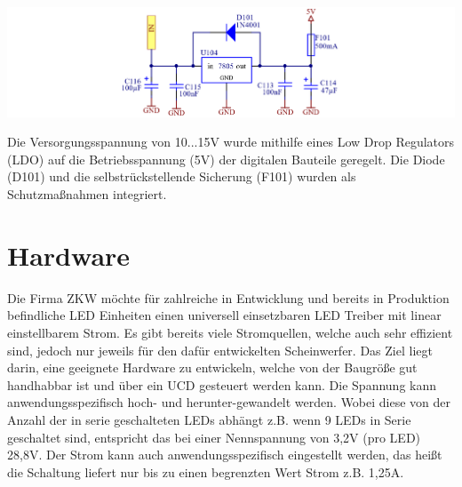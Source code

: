 \documentclass[paper=a4, 12pt]{scrreprt}
\begin{document}
	\begin{adjustbox}{center,caption={VoltageRegulator 7805 },label={fig:VoltageRegulator.PNG},nofloat=figure,vspace=\bigskipamount}
		\includegraphics[width=\textwidth]{img/VoltageRegulator.PNG}
	\end{adjustbox}
 	Die Versorgungsspannung von 10...15V wurde mithilfe eines Low Drop Regulators (LDO) auf die Betriebsspannung (5V) der digitalen Bauteile geregelt. Die Diode (D101) und die selbstrückstellende Sicherung (F101) wurden als Schutzmaßnahmen integriert.
	\newpage
	
	\section{Hardware}\hfill \break
	Die Firma ZKW möchte für zahlreiche in Entwicklung und bereits in Produktion befindliche LED Einheiten einen universell einsetzbaren LED Treiber mit linear einstellbarem Strom. Es gibt bereits viele Stromquellen, welche auch sehr effizient sind, jedoch nur jeweils für den dafür entwickelten Scheinwerfer. 
	Das Ziel liegt darin, eine geeignete Hardware zu entwickeln, welche von der Baugröße gut handhabbar ist und über ein UCD gesteuert werden kann.
	Die Spannung kann anwendungsspezifisch hoch- und herunter-gewandelt werden. Wobei diese von der Anzahl der in serie geschalteten LEDs abhängt z.B.  wenn 9 LEDs in Serie geschaltet sind, entspricht das bei einer Nennspannung von 3,2V (pro LED) 28,8V.
	Der Strom kann auch anwendungsspezifisch eingestellt werden, das heißt die Schaltung liefert nur bis zu einen begrenzten Wert Strom z.B. 1,25A.
\end{document}
